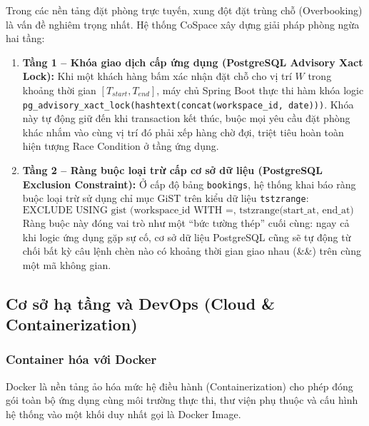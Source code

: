Trong các nền tảng đặt phòng trực tuyến, xung đột đặt trùng chỗ (Overbooking) là vấn đề nghiêm trọng nhất. Hệ thống CoSpace xây dựng giải pháp phòng ngừa hai tầng:
\begin{enumerate}
    \item \textbf{Tầng 1 -- Khóa giao dịch cấp ứng dụng (PostgreSQL Advisory Xact Lock):} Khi một khách hàng bấm xác nhận đặt chỗ cho vị trí $W$ trong khoảng thời gian $[T_{start}, T_{end}]$, máy chủ Spring Boot thực thi hàm khóa logic \texttt{pg\_advisory\_xact\_lock(hashtext(concat(workspace\_id, date)))}. Khóa này tự động giữ đến khi transaction kết thúc, buộc mọi yêu cầu đặt phòng khác nhắm vào cùng vị trí đó phải xếp hàng chờ đợi, triệt tiêu hoàn toàn hiện tượng Race Condition ở tầng ứng dụng.
    \item \textbf{Tầng 2 -- Ràng buộc loại trừ cấp cơ sở dữ liệu (PostgreSQL Exclusion Constraint):} Ở cấp độ bảng \texttt{bookings}, hệ thống khai báo ràng buộc loại trừ sử dụng chỉ mục GiST trên kiểu dữ liệu \texttt{tstzrange}:
    \begin{equation*}
        \text{EXCLUDE USING gist (workspace\_id WITH =, tstzrange(start\_at, end\_at) WITH \&\&)}
    \end{equation*}
    Ràng buộc này đóng vai trò như một ``bức tường thép'' cuối cùng: ngay cả khi logic ứng dụng gặp sự cố, cơ sở dữ liệu PostgreSQL cũng sẽ tự động từ chối bất kỳ câu lệnh chèn nào có khoảng thời gian giao nhau (\&\&) trên cùng một mã không gian.
\end{enumerate}

\subsection{Cơ sở hạ tầng và DevOps (Cloud \& Containerization)}

\subsubsection{Container hóa với Docker}

Docker là nền tảng ảo hóa mức hệ điều hành (Containerization) cho phép đóng gói toàn bộ ứng dụng cùng môi trường thực thi, thư viện phụ thuộc và cấu hình hệ thống vào một khối duy nhất gọi là Docker Image. 


